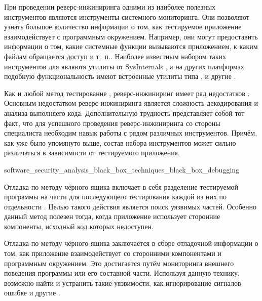 %
При проведении реверс-инжиниринга одними из наиболее полезных инструментов являются инструменты системного мониторинга. 
%
Они позволяют узнать большое количество информации о том, как тестируемое приложение взаимодействует с программным окружением. 
%
Например, они могут предоставить информации о том, какие системные функции вызываются приложением, к каким файлам обращается доступ и т. п.. 
%
Наиболее известным набором таких инструментов для    являютя утилиты от SysInternals , а на других платформах подобную функциональность имеют встроенные утилиты типа ,  и другие .

%
Как и любой метод тестирование , реверс-инжиниринг имеет ряд недостатков . 
%
Основным недостатком реверс-инжиниринга является сложность декодирования и анализа выполняего кода. 
%
Дополнительную трудность представляет собой тот факт, что для успешного проведения реверс-инжиниринга со стороны специалиста необходим навык работы с рядом различных инструментов. 
%
Причём, как уже было упомянуто выше, состав набора инструментов может сильно различаться в зависимости от тестируемого приложения.


	{software_security_analysis_black_box_techniques_black_box_debugging}

%
Отладка по методу чёрного ящика включает в себя разделение тестируемой программы на части для последующего тестирования каждой из них по отдельности . 
%
Целью такого действия является поиск уязвимых частей. Особенно данный метод полезен тогда, когда приложение использует сторонние компоненты, исходный код которых недоступен.

%
Отладка по методу чёрного ящика заключается в сборе отладочной информации о том, как приложение взаимодействует со сторонними компонентами и программным окружением. 
%
Это достигается путём мониторинга внешнего поведения программы или его составной части. 
%
Используя данную технику, возможно найти и устранить такие уязвимости, как игнорирование сигналов ошибке и другие .

